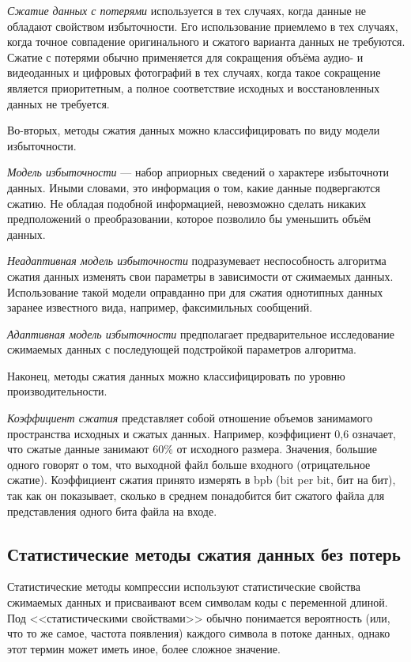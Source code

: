 \textit{Сжатие данных с потерями} используется в тех случаях,
когда данные не обладают свойством избыточности. Его использование
приемлемо в тех случаях, когда точное совпадение оригинального и сжатого
варианта данных не требуются.
Сжатие с потерями обычно применяется для сокращения объёма аудио- и видеоданных
и цифровых фотографий в тех случаях, когда такое сокращение является
приоритетным, а полное соответствие исходных и восстановленных данных
не требуется.

Во-вторых, методы сжатия данных можно классифицировать 
по виду модели избыточности.

\textit{Модель избыточности} --- набор априорных сведений о характере
избыточноти данных. Иными словами, это информация о том, какие данные
подвергаются сжатию. Не обладая подобной информацией, 
невозможно сделать никаких предположений о преобразовании, 
которое позволило бы уменьшить объём данных.

\textit{Неадаптивная модель избыточности} подразумевает неспособность 
алгоритма сжатия данных изменять свои параметры в зависимости 
от сжимаемых данных. Использование такой модели оправданно 
при для сжатия однотипных данных заранее известного вида, 
например, факсимильных сообщений.

\textit{Адаптивная модель избыточности} предполагает предварительное 
исследование сжимаемых данных с последующей подстройкой параметров алгоритма.

Наконец, методы сжатия данных можно классифицировать 
по уровню производительности.

\textit{Коэффициент сжатия} представляет собой отношение объемов
занимамого пространства исходных и сжатых данных.
Например, коэффициент 0{,}6 означает, что сжатые данные занимают
60\% от исходного размера. Значения, большие одного говорят о том,
что выходной файл больше входного (отрицательное сжатие).
Коэффициент сжатия принято измерять в bpb (bit per bit, бит на бит),
так как он показывает, сколько в среднем понадобится бит сжатого файла
для представления одного бита файла на входе. 

\newpage

\subsection{Статистические методы сжатия данных без потерь}
\label{ssec:statistical_methods}

Статистические методы компрессии используют статистические свойства
сжимаемых данных и присваивают всем символам коды с переменной длиной.
Под <<статистическими свойствами>> обычно понимается вероятность 
(или, что то же самое, частота появления) каждого символа в потоке данных,
однако этот термин может иметь иное, более сложное значение.

